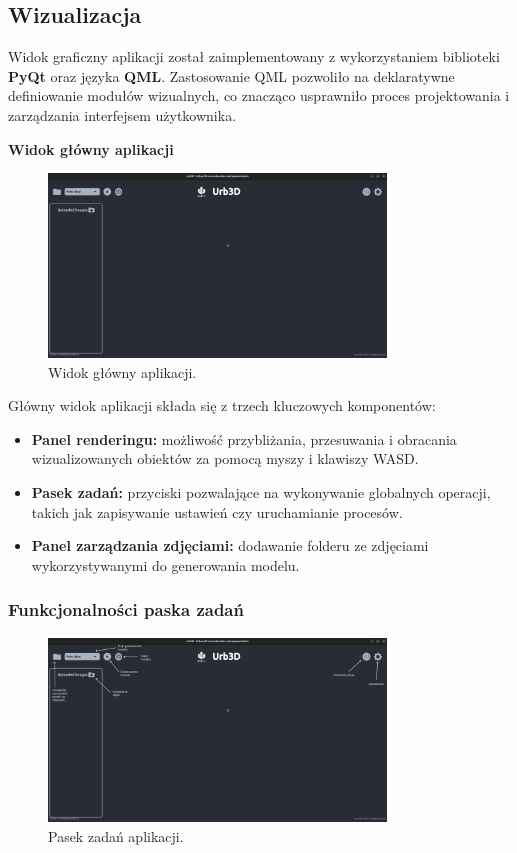 \subsection{Wizualizacja}

Widok graficzny aplikacji został zaimplementowany z wykorzystaniem biblioteki \textbf{PyQt} oraz języka \textbf{QML}. Zastosowanie QML pozwoliło na deklaratywne definiowanie modułów wizualnych, co znacząco usprawniło proces projektowania i zarządzania interfejsem użytkownika.

\clearpage

\textbf{Widok główny aplikacji}
\begin{figure}[h!]
    \centering
    \includegraphics[width=0.8\textwidth]{img/wizualizacja/ui_glowny_widok.png}
    \caption{Widok główny aplikacji.}
\end{figure}

Główny widok aplikacji składa się z trzech kluczowych komponentów:
\begin{itemize}
    \item \textbf{Panel renderingu:} możliwość przybliżania, przesuwania i obracania wizualizowanych obiektów za pomocą myszy i klawiszy WASD.
    \item \textbf{Pasek zadań:} przyciski pozwalające na wykonywanie globalnych operacji, takich jak zapisywanie ustawień czy uruchamianie procesów.
    \item \textbf{Panel zarządzania zdjęciami:} dodawanie folderu ze zdjęciami wykorzystywanymi do generowania modelu.
\end{itemize}

\subsubsection{Funkcjonalności paska zadań}
\begin{figure}[h!]
    \centering
    \includegraphics[width=0.8\textwidth]{img/wizualizacja/ui_opis_funk.png}
    \caption{Pasek zadań aplikacji.}
\end{figure}


